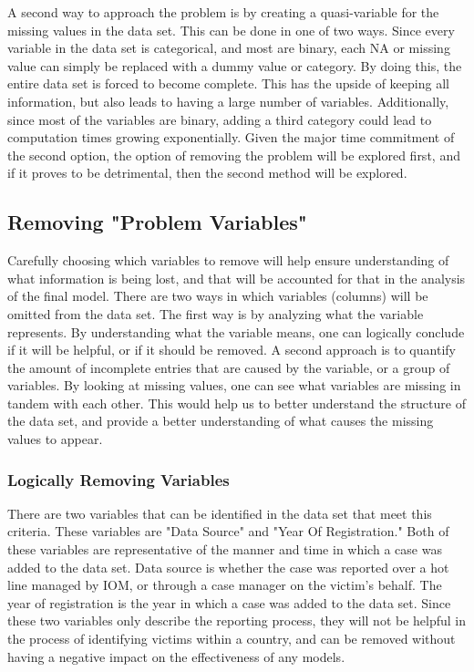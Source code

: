 \documentclass{article} %
\begin{document}
	A second way to approach the problem is by creating a quasi-variable for the missing values in the data set. This can be done in one of two ways. Since every variable in the data set is categorical, and most are binary, each NA or missing value can simply be replaced with a dummy value or category. By doing this, the entire data set is forced to become complete. This has the upside of keeping all information, but also leads to having a large number of variables. Additionally, since most of the variables are binary, adding a third category could lead to computation times growing exponentially. Given the major time commitment of the second option, the option of removing the problem will be explored first, and if it proves to be detrimental, then the second method will be explored.
	
	
	
	\subsection{Removing "Problem Variables"}\label{RemoveVariables}
	
	
	Carefully choosing which variables to remove will help ensure understanding of what information is being lost, and that will be accounted for that in the analysis of the final model. There are two ways in which variables (columns) will be omitted from the data set. The first way is by analyzing what the variable represents. By understanding what the variable means, one can logically conclude if it will be helpful, or if it should be removed. A second approach is to quantify the amount of incomplete entries that are caused by the variable, or a group of variables. By looking at missing values, one can see what variables are missing in tandem with each other. This would help us to better understand the structure of the data set, and provide a better understanding of what causes the missing values to appear.
	
	\subsubsection{Logically Removing Variables} \label{RemoveVariablesLogically}
	 
	
	There are two variables that can be identified in the data set that meet this criteria. These variables are "Data Source" and "Year Of Registration." Both of these variables are representative of the manner and time in which a case was added to the data set. Data source is whether the case was reported over a hot line managed by IOM, or through a case manager on the victim's behalf. The year of registration is the year in which a case was added to the data set. Since these two variables only describe the reporting process, they will not be helpful in the process of identifying victims within a country, and can be removed without having a negative impact on the effectiveness of any models.
	
\end{document}
